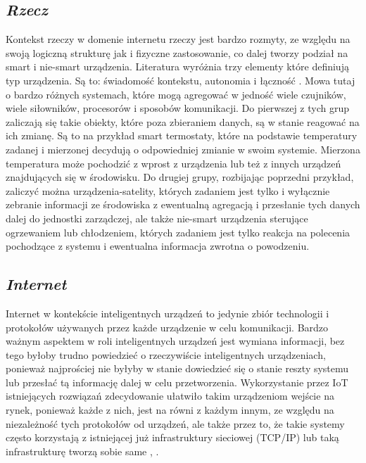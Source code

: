 \subsection{\textit{Rzecz}}
Kontekst rzeczy w domenie internetu rzeczy jest bardzo rozmyty, ze względu na swoją logiczną strukturę jak i fizyczne zastosowanie, co dalej tworzy podział na smart i nie-smart urządzenia. Literatura wyróżnia trzy elementy które definiują typ urządzenia. Są to: świadomość kontekstu, autonomia i łączność \cite{smart_dumb_devices}. Mowa tutaj o bardzo różnych systemach, które mogą agregować w jedność wiele czujników, wiele siłowników, procesorów i sposobów komunikacji. Do pierwszej z tych grup zaliczają się takie obiekty, które poza zbieraniem danych, są w stanie reagować na ich zmianę. Są to na przykład smart termostaty, które na podstawie temperatury zadanej i mierzonej decydują o odpowiedniej zmianie w swoim systemie. Mierzona temperatura może pochodzić z wprost z urządzenia lub też z innych urządzeń znajdujących się w środowisku. Do drugiej grupy, rozbijając poprzedni przykład, zaliczyć można urządzenia-satelity, których zadaniem jest tylko i wyłącznie zebranie informacji ze środowiska z ewentualną agregacją i przesłanie tych danych dalej do jednostki zarządczej, ale także nie-smart urządzenia sterujące ogrzewaniem lub chłodzeniem, których zadaniem jest tylko reakcja na polecenia pochodzące z systemu i ewentualna informacja zwrotna o powodzeniu.


\subsection{\textit{Internet}}
Internet w kontekście inteligentnych urządzeń to jedynie zbiór technologii i protokołów używanych przez każde urządzenie w celu komunikacji. Bardzo ważnym aspektem w roli inteligentnych urządzeń jest wymiana informacji, bez tego byłoby trudno powiedzieć o rzeczywiście inteligentnych urządzeniach, ponieważ najprościej nie byłyby w stanie dowiedzieć się o stanie reszty systemu lub przesłać tą informację dalej w celu przetworzenia. Wykorzystanie przez IoT istniejących rozwiązań zdecydowanie ułatwiło takim urządzeniom wejście na rynek, ponieważ każde z nich, jest na równi z każdym innym, ze względu na niezależność tych protokołów od urządzeń, ale także przez to, że takie systemy często korzystają z istniejącej już infrastruktury sieciowej (TCP/IP) \cite{rfc791} lub taką infrastrukturę tworzą sobie same \cite{spontaneous_networking}, \cite{spontaneous_wireless_networking}.


